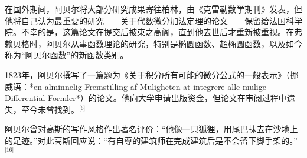 在国外期间，阿贝尔将大部分研究成果寄往柏林，由《克雷勒数学期刊》发表，但他将自己认为最重要的研究——关于代数微分加法定理的论文——保留给法国科学院。不幸的是，这篇论文在提交后被束之高阁，直到他去世后才重新被重视。在弗赖贝格时，阿贝尔从事函数理论的研究，特别是椭圆函数、超椭圆函数，以及如今称为“阿贝尔函数”的新函数类别。

1823年，阿贝尔撰写了一篇题为《关于积分所有可能的微分公式的一般表示》（挪威语：*en alminnelig Fremstilling af Muligheten at integrere alle mulige Differential-Formler*）的论文。他向大学申请出版资金，但论文在审阅过程中遗失，至今未曾找到。\(^\text{[6]}\)

阿贝尔曾对高斯的写作风格作出著名评价：“他像一只狐狸，用尾巴抹去在沙地上的足迹。”对此高斯回应说：“有自尊的建筑师在完成建筑后是不会留下脚手架的。”\(^\text{[16]}\)

